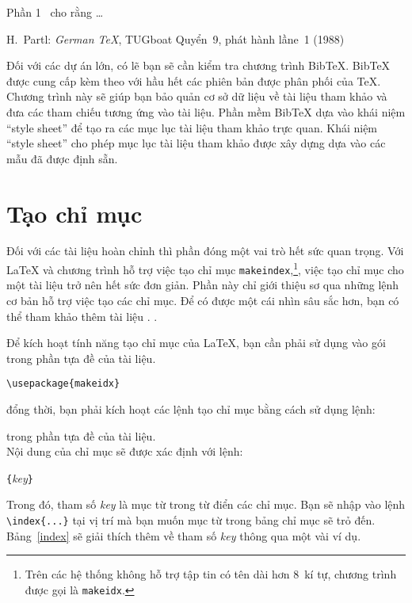 \enlargethispage{2cm}
\begin{example}
Phần 1~\cite{pa} cho rằng \ldots
\begin{thebibliography}{99}
 H.~Partl:
\emph{German \TeX}, TUGboat Quyển~9,
phát hành lầne~1 (1988)
\end{thebibliography}
\end{example}

\thispagestyle{fancyplain}

\newpage
Đối với các dự án lớn, có lẽ bạn sẽ cần kiểm tra chương trình Bib\TeX{}. Bib\TeX{} được cung cấp kèm theo với hầu hết các phiên bản được phân phối của \TeX{}. Chương trình này sẽ giúp bạn bảo quản cơ sở dữ liệu về tài liệu tham khảo và đưa các tham chiếu tương ứng vào tài liệu. Phần mềm Bib\TeX{} dựa vào khái niệm ``style sheet'' để tạo ra các mục lục tài liệu tham khảo trực quan. Khái niệm ``style sheet'' cho phép mục lục tài liệu tham khảo được xây dựng dựa vào các mẫu đã được định sẵn.

\section{Tạo chỉ mục} \label{sec:indexing}
Đối với các tài liệu hoàn chỉnh thì phần  đóng một vai trò hết sức quan trọng. Với \LaTeX{} và chương trình hỗ trợ việc tạo chỉ mục \texttt{makeindex},\footnote{Trên các hệ thống không hỗ trợ tập tin có tên dài hơn 8~kí tự, chương trình được gọi là \texttt{makeidx}.}, việc tạo chỉ mục cho một tài liệu trở nên hết sức đơn giản. Phần này chỉ giới thiệu sơ qua những lệnh cơ bản hỗ trợ việc tạo các chỉ mục. Để có được một cái nhìn sâu sắc hơn, bạn có thể tham khảo thêm tài liệu \companion. . 

Để kích hoạt tính năng tạo chỉ mục của \LaTeX{}, bạn cần phải sử dụng vào gói  trong phần tựa đề của tài liệu.
\begin{lscommand}
\verb|\usepackage{makeidx}|
\end{lscommand}
\noindent đổng thời, bạn phải kích hoạt các lệnh tạo chỉ mục bằng cách sử dụng lệnh:
\begin{lscommand}
\end{lscommand}
\noindent trong phần tựa đề của tài liệu.\\

\noindent Nội dung của chỉ mục sẽ được xác định với lệnh:
\begin{lscommand}
  \verb|{|\emph{key}\verb|}|
\end{lscommand}
\noindent Trong đó, tham số \emph{key} là mục từ trong từ điển các
chỉ mục. Bạn sẽ nhập vào lệnh \verb|\index{...}| tại vị trí mà bạn
muốn mục từ trong bảng chỉ mục sẽ trỏ đến. Bảng~\ref{index} sẽ
giải thích thêm về tham số \emph{key} thông qua một vài ví dụ.

